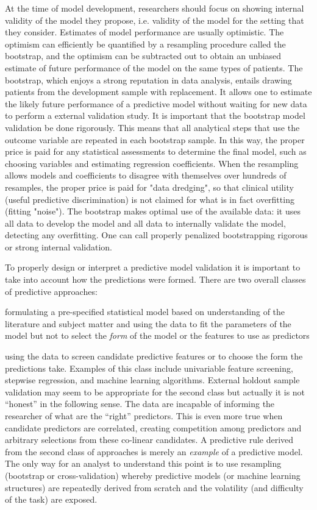 {At the time of model development, researchers should focus on showing
internal validity of the model they propose, i.e. validity of the
model for the setting that they consider.  Estimates of model
performance are usually optimistic. The optimism can efficiently be
quantified by a resampling procedure called the bootstrap, and the
optimism can be subtracted out to obtain an unbiased estimate of
future performance of the model on the same types of patients.  The
bootstrap, which enjoys a strong reputation in data analysis, entails
drawing patients from the development sample with replacement.  It
allows one to estimate the likely future performance of a predictive
model without waiting for new data to perform a external validation
study.  It is important that the bootstrap model validation be done
rigorously. This means that all analytical steps that use the outcome
variable are repeated in each bootstrap sample.  In this way, the
proper price is paid for any statistical assessments to determine the
final model, such as choosing variables and estimating regression
coefficients.  When the resampling allows models and coefficients to
disagree with themselves over hundreds of resamples, the proper price
is paid for "data dredging", so that clinical utility (useful
predictive discrimination) is not claimed for what is in fact
overfitting (fitting "noise").  The bootstrap makes optimal use of the
available data: it uses all data to develop the model and all data to
internally validate the model, detecting any overfitting.  One can
call properly penalized bootstrapping rigorous or strong internal
validation.
}

To properly design or interpret a predictive model validation it is
important to take into account how the predictions were formed.  There
are two overall classes of predictive approaches:
\bi
\item formulating a pre-specified statistical model based on
  understanding of the literature and subject matter and using the
  data to fit the parameters of the model but not to select the
  \emph{form} of the model or the features to use as predictors
\item using the data to screen candidate predictive features or to
  choose the form the predictions take.  Examples of this class
  include univariable feature screening, stepwise regression, and
  machine learning algorithms.
\ei
External holdout sample validation may seem to be appropriate for the
second class but actually it is not ``honest'' in the following
sense.  The data are incapable of informing the researcher of what are
the ``right'' predictors.  This is even more true when candidate
predictors are correlated, creating competition among predictors and
arbitrary selections from these co-linear candidates.  A predictive
rule derived from the second class of approaches is merely an
\emph{example} of a predictive model.  The only way for an analyst to
understand this point is to use resampling (bootstrap or
cross-validation) whereby predictive models (or machine learning
structures) are repeatedly derived from scratch and the volatility (and
difficulty of the task) are exposed.


